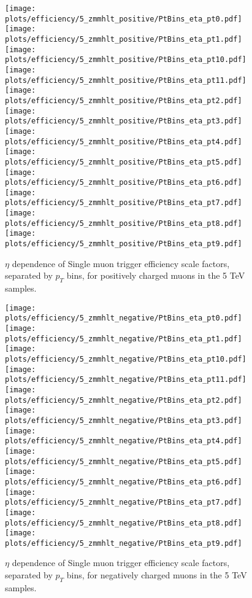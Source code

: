 \begin{figure}
\centering
\texttt{[image: plots/efficiency/5\_zmmhlt\_positive/PtBins\_eta\_pt0.pdf]}
\texttt{[image: plots/efficiency/5\_zmmhlt\_positive/PtBins\_eta\_pt1.pdf]}
\texttt{[image: plots/efficiency/5\_zmmhlt\_positive/PtBins\_eta\_pt10.pdf]}
\texttt{[image: plots/efficiency/5\_zmmhlt\_positive/PtBins\_eta\_pt11.pdf]}
\texttt{[image: plots/efficiency/5\_zmmhlt\_positive/PtBins\_eta\_pt2.pdf]}
\texttt{[image: plots/efficiency/5\_zmmhlt\_positive/PtBins\_eta\_pt3.pdf]}
\texttt{[image: plots/efficiency/5\_zmmhlt\_positive/PtBins\_eta\_pt4.pdf]}
\texttt{[image: plots/efficiency/5\_zmmhlt\_positive/PtBins\_eta\_pt5.pdf]}
\texttt{[image: plots/efficiency/5\_zmmhlt\_positive/PtBins\_eta\_pt6.pdf]}
\texttt{[image: plots/efficiency/5\_zmmhlt\_positive/PtBins\_eta\_pt7.pdf]}
\texttt{[image: plots/efficiency/5\_zmmhlt\_positive/PtBins\_eta\_pt8.pdf]}
\texttt{[image: plots/efficiency/5\_zmmhlt\_positive/PtBins\_eta\_pt9.pdf]}
\caption{$\eta$ dependence of Single muon trigger efficiency scale factors, separated by $p_T$ bins, for positively charged muons in the 5 TeV samples.}
\label{fig:Eff:mu:5:HLT:pos}
\end{figure}
\begin{figure}
\centering
\texttt{[image: plots/efficiency/5\_zmmhlt\_negative/PtBins\_eta\_pt0.pdf]}
\texttt{[image: plots/efficiency/5\_zmmhlt\_negative/PtBins\_eta\_pt1.pdf]}
\texttt{[image: plots/efficiency/5\_zmmhlt\_negative/PtBins\_eta\_pt10.pdf]}
\texttt{[image: plots/efficiency/5\_zmmhlt\_negative/PtBins\_eta\_pt11.pdf]}
\texttt{[image: plots/efficiency/5\_zmmhlt\_negative/PtBins\_eta\_pt2.pdf]}
\texttt{[image: plots/efficiency/5\_zmmhlt\_negative/PtBins\_eta\_pt3.pdf]}
\texttt{[image: plots/efficiency/5\_zmmhlt\_negative/PtBins\_eta\_pt4.pdf]}
\texttt{[image: plots/efficiency/5\_zmmhlt\_negative/PtBins\_eta\_pt5.pdf]}
\texttt{[image: plots/efficiency/5\_zmmhlt\_negative/PtBins\_eta\_pt6.pdf]}
\texttt{[image: plots/efficiency/5\_zmmhlt\_negative/PtBins\_eta\_pt7.pdf]}
\texttt{[image: plots/efficiency/5\_zmmhlt\_negative/PtBins\_eta\_pt8.pdf]}
\texttt{[image: plots/efficiency/5\_zmmhlt\_negative/PtBins\_eta\_pt9.pdf]}
\caption{$\eta$ dependence of Single muon trigger efficiency scale factors, separated by $p_T$ bins, for negatively charged muons in the 5 TeV samples.}
\label{fig:Eff:mu:5:HLT:neg}
\end{figure}

